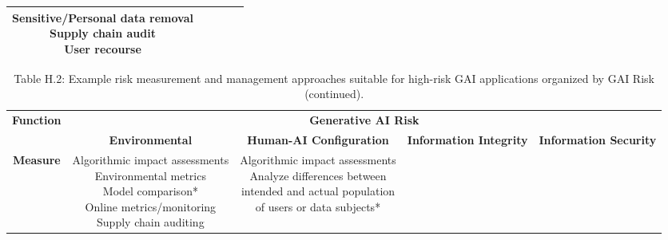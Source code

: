 \documentclass[fleqn]{article}
\begin{document}
\begin{landscape}
\begin{table}[H]
\begin{tabular}{|c|c|c|c|c|}
{			\textbullet\hspace{3pt} Sensitive/Personal data removal \\ 	
			\textbullet\hspace{3pt} Supply chain audit \\ 	
			\textbullet\hspace{3pt} User recourse \\  	 
		}
		\\
		\hline
	\end{tabular}
	\label{table:high_risk_plan_by_gai_risk}
\end{table}

\vfill
\raisebox{-10pt}{\makebox[\linewidth]{\thepage}}

\pagebreak
\thispagestyle{empty}

\begin{table}[H]
	\caption*{Table H.2: Example risk measurement and management approaches suitable for high-risk GAI applications organized by GAI Risk (continued).}
	\footnotesize
	\begin{tabular}{|c|c|c|c|c|}
		\hline
		\multirow{2}{*}{\textbf{Function}} & \multicolumn{4}{|c|}{\textbf{Generative AI Risk}}   \\
		\cline{2-5}
		& \textbf{Environmental} & \textbf{Human-AI Configuration} & \textbf{Information Integrity} & \textbf{Information Security} \\
		\hline	
		\textbf{Measure} & 
		\makecell[l]{
			\textbullet\hspace{3pt}  Algorithmic impact assessments \\ 
			\textbullet\hspace{3pt}  Environmental metrics \\ 
			\textbullet\hspace{3pt}  Model comparison*\\ 
			\textbullet\hspace{3pt}  Online metrics/monitoring \\ 
			\textbullet\hspace{3pt}  Supply chain auditing \\ 
		}
		& \makecell[l]{
			\textbullet\hspace{3pt} Algorithmic impact assessments \\ 
			\textbullet\hspace{3pt} Analyze differences between\\\hspace{10pt}intended and actual population\\\hspace{10pt}of users or data subjects*\\ 	 
}
\end{tabular}
\end{table}
\end{landscape}
\end{document}
